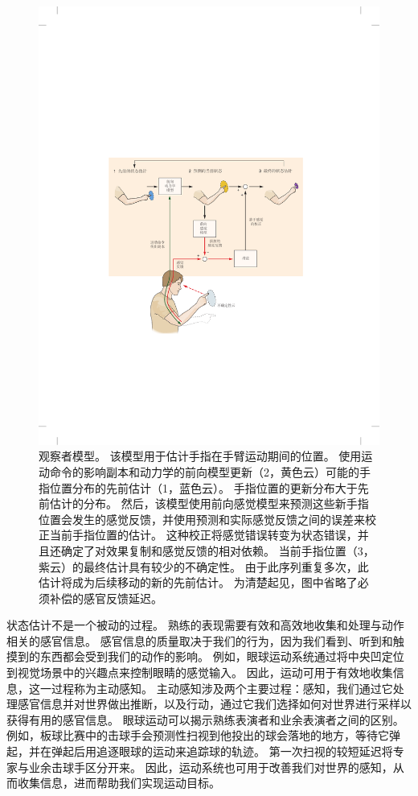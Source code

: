 \begin{figure}[htbp]
	\centering
	\includegraphics[width=0.9\linewidth]{chap30/fig_30_5}
	\caption{观察者模型。
		该模型用于估计手指在手臂运动期间的位置。
		使用运动命令的影响副本和动力学的前向模型更新（2，黄色云）可能的手指位置分布的先前估计（1，蓝色云）。
		手指位置的更新分布大于先前估计的分布。
		然后，该模型使用前向感觉模型来预测这些新手指位置会发生的感觉反馈，并使用预测和实际感觉反馈之间的误差来校正当前手指位置的估计。
		这种校正将感觉错误转变为状态错误，并且还确定了对效果复制和感觉反馈的相对依赖。
		当前手指位置（3，紫云）的最终估计具有较少的不确定性。
		由于此序列重复多次，此估计将成为后续移动的新的先前估计。
		为清楚起见，图中省略了必须补偿的感官反馈延迟。}
	\label{fig:30_5}
\end{figure}


状态估计不是一个被动的过程。
熟练的表现需要有效和高效地收集和处理与动作相关的感官信息。
感官信息的质量取决于我们的行为，因为我们看到、听到和触摸到的东西都会受到我们的动作的影响。
例如，眼球运动系统通过将中央凹定位到视觉场景中的兴趣点来控制眼睛的感觉输入。
因此，运动可用于有效地收集信息，这一过程称为主动感知。
主动感知涉及两个主要过程：感知，我们通过它处理感官信息并对世界做出推断，以及行动，通过它我们选择如何对世界进行采样以获得有用的感官信息。
眼球运动可以揭示熟练表演者和业余表演者之间的区别。
例如，板球比赛中的击球手会预测性扫视到他投出的球会落地的地方，等待它弹起，并在弹起后用追逐眼球的运动来追踪球的轨迹。
第一次扫视的较短延迟将专家与业余击球手区分开来。
因此，运动系统也可用于改善我们对世界的感知，从而收集信息，进而帮助我们实现运动目标。




